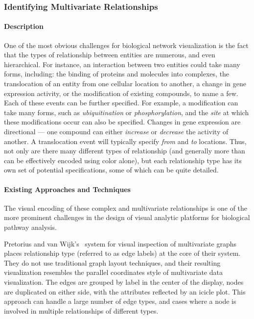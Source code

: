 \documentclass[twocolumn]{bmcart}%
\begin{document}
\subsubsection*{Identifying Multivariate Relationships}

\paragraph*{Description}

One of the most obvious challenges for biological network visualization is the fact that the types of relationship between entities are numerous, and even hierarchical.
For instance, an interaction between two entities could take many forms, including: the binding of proteins and molecules into complexes, the translocation of an entity from one cellular location to another, a change in gene expression activity, or the modification of existing compounds, to name a few.
Each of these events can be further specified.
For example, a modification can take many forms, such as \textit{ubiquitination} or \textit{phosphorylation}, and the \textit{site} at which these modifications occur can also be specified.
Changes in gene expression are directional --- one compound can either \textit{increase} or \textit{decrease} the activity of another.
A translocation event will typically specify \textit{from} and \textit{to} locations.
Thus, not only are there many different types of relationship (and generally more than can be effectively encoded using color alone), but each relationship type has its own set of potential specifications, some of which can be quite detailed.

\paragraph*{Existing Approaches and Techniques}

The visual encoding of these complex and multivariate relationships is one of the more prominent challenges in the design of visual analytic platforms for biological pathway analysis.

Pretorius and van Wijk's~\cite{pretorius2008} system for visual inspection of multivariate graphs places relationship type (referred to as edge labels) at the core of their system.
They do not use traditional graph layout techniques, and their resulting visualization resembles the parallel coordinates style of multivariate data visualization.
The edges are grouped by label in the center of the display, nodes are duplicated on either side, with the attributes reflected by an icicle plot.
This approach can handle a large number of edge types, and cases where a node is involved in multiple relationships of different types.
\end{document}
